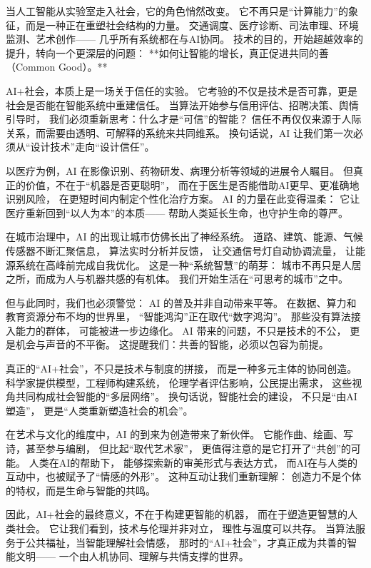 当人工智能从实验室走入社会，它的角色悄然改变。  
它不再只是“计算能力”的象征，而是一种正在重塑社会结构的力量。  
交通调度、医疗诊断、司法审理、环境监测、艺术创作——  
几乎所有系统都在与AI协同。  
技术的目的，开始超越效率的提升，转向一个更深层的问题：  
**如何让智能的增长，真正促进共同的善（Common Good）。**

AI+社会，本质上是一场关于信任的实验。  
它考验的不仅是技术是否可靠，更是社会是否能在智能系统中重建信任。  
当算法开始参与信用评估、招聘决策、舆情引导时，  
我们必须重新思考：什么才是“可信”的智能？  
信任不再仅仅来源于人际关系，而需要由透明、可解释的系统来共同维系。  
换句话说，AI 让我们第一次必须从“设计技术”走向“设计信任”。

以医疗为例，AI 在影像识别、药物研发、病理分析等领域的进展令人瞩目。  
但真正的价值，不在于“机器是否更聪明”，  
而在于医生是否能借助AI更早、更准确地识别风险，  
在更短时间内制定个性化治疗方案。  
AI 的力量在此变得温柔：  
它让医疗重新回到“以人为本”的本质——  
帮助人类延长生命，也守护生命的尊严。

在城市治理中，AI 的出现让城市仿佛长出了神经系统。  
道路、建筑、能源、气候传感器不断汇聚信息，  
算法实时分析并反馈，  
让交通信号灯自动协调流量，  
让能源系统在高峰前完成自我优化。  
这是一种“系统智慧”的萌芽：  
城市不再只是人居之所，而成为人与机器共感的有机体。  
我们开始生活在“可思考的城市”之中。

但与此同时，我们也必须警觉：  
AI 的普及并非自动带来平等。  
在数据、算力和教育资源分布不均的世界里，  
“智能鸿沟”正在取代“数字鸿沟”。  
那些没有算法接入能力的群体，  
可能被进一步边缘化。  
AI 带来的问题，不只是技术的不公，  
更是机会与声音的不平衡。  
这提醒我们：共善的智能，必须以包容为前提。

真正的“AI+社会”，不只是技术与制度的拼接，  
而是一种多元主体的协同创造。  
科学家提供模型，工程师构建系统，  
伦理学者评估影响，公民提出需求，  
这些视角共同构成社会智能的“多层网络”。  
换句话说，智能社会的建设，  
不只是“由AI塑造”，  
更是“人类重新塑造社会的机会”。

在艺术与文化的维度中，AI 的到来为创造带来了新伙伴。  
它能作曲、绘画、写诗，甚至参与编剧，  
但比起“取代艺术家”，  
更值得注意的是它打开了“共创”的可能。  
人类在AI的帮助下，  
能够探索新的审美形式与表达方式，  
而AI在与人类的互动中，也被赋予了“情感的外形”。  
这种互动让我们重新理解：  
创造力不是个体的特权，而是生命与智能的共鸣。

因此，AI+社会的最终意义，不在于构建更智能的机器，  
而在于塑造更智慧的人类社会。  
它让我们看到，技术与伦理并非对立，  
理性与温度可以共存。  
当算法服务于公共福祉，当智能理解社会情感，  
那时的“AI+社会”，才真正成为共善的智能文明——  
一个由人机协同、理解与共情支撑的世界。

